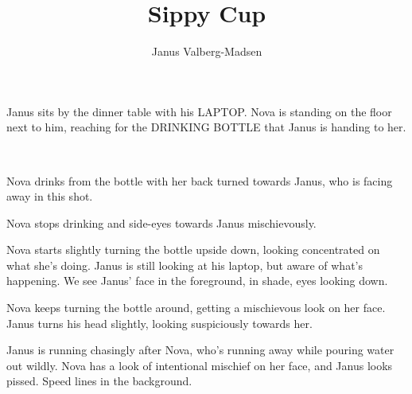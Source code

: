 \documentclass[a4paper,12pt]{../comicscript}
\title{Sippy Cup}
\author{Janus Valberg-Madsen}
\begin{document}
\maketitle

\page

Janus sits by the dinner table with his LAPTOP. 
Nova is standing on the floor next to him, reaching for the DRINKING BOTTLE that Janus is handing to her.
\begin{lettering}
     \\
\end{lettering}

\label{panel:drinking}
Nova drinks from the bottle with her back turned towards Janus, who is facing away in this shot.
\begin{lettering}
\end{lettering}

Nova stops drinking and side-eyes towards Janus mischievously.

\label{panel:pouring}
Nova starts slightly turning the bottle upside down, looking concentrated on what she’s doing. 
Janus is still looking at his laptop, but aware of what’s happening. 
We see Janus’ face in the foreground, in shade, eyes looking down.
\begin{lettering}
\end{lettering}

Nova keeps turning the bottle around, getting a mischievous look on her face.
Janus turns his head slightly, looking suspiciously towards her.

Janus is running chasingly after Nova, who’s running away while pouring water out wildly. 
Nova has a look of intentional mischief on her face, and Janus looks pissed. 
Speed lines in the background.

\newpage
\page

\panel
\lipsum[1]

\panel
\lipsum[2]
\end{document}
